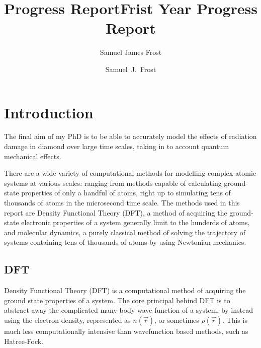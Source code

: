 \documentclass[10pt,a4paper,twocolumn,twoside]{extarticle}
\title{Progress Report}
\author{Samuel James Frost}
\title{Frist Year Progress Report}
\author{Samuel~J.~Frost}
\begin{document}
	\thispagestyle{empty}
	\tableofcontents

	
\section{Introduction}

The final aim of my PhD is to be able to accurately model the effects of radiation damage in diamond over large time scales, taking in to account quantum mechanical effects.




There are a wide variety of computational methods for modelling complex atomic systems at various scales: ranging from methods capable of calculating ground-state properties of only a handful of atoms, right up to simulating tens of thousands of atoms in the microsecond time scale. The methods used in this report are Density Functional Theory (DFT), a method of acquiring the ground-state electronic properties of a system generally limit to the hunderds of atoms, and molecular dynamics, a purely classical method of solving the trajectory of systems containing tens of thousands of atoms by using Newtonian mechanics. 

\subsection{DFT}
Density Functional Theory (DFT) is a computational method of acquiring the ground state properties of a system. 
The core principal behind DFT is to abstract away the complicated many-body wave function of a system, by instead using the electron density, represented as $n(\vec{r})$, or sometimes $\rho(\vec{r})$. This is much less computationally intensive than wavefunction based methods, such as Hatree-Fock. 
\end{document}
